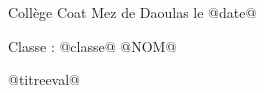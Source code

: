 \newpage
\setcounter{exo}{0}


Collège Coat Mez de Daoulas  \hfill  le @date@

Classe : @classe@ \hfill @NOM@

\begin{center}
\begin{LARGE} @titreeval@ \end{LARGE}
\end{center}


